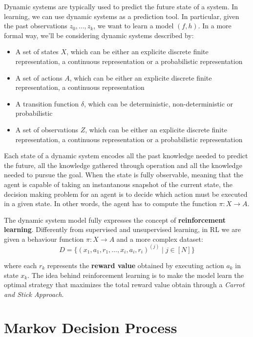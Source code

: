 \documentclass[a4paper, 12pt]{report}
\begin{document}
    Dynamic systems are typically used to predict the future state of a system. In learning, we can use dynamic systems as a prediction tool. In particular, given the past observations $z_0, \ldots, z_k$, we want to learn a model $(f,h)$. In a more formal way, we'll be considering dynamic systems described by:
    \begin{itemize}
        \item A set of states $X$, which can be either an explicite discrete finite representation, a continuous representation or a probabilistic representation
        \item A set of actions $A$, which can be either an explicite discrete finite representation, a continuous representation
        \item A transition function $\delta$, which can be deterministic, non-deterministic or probabilistic
        \item A set of observations $Z$, which can be either an explicite discrete finite representation, a continuous representation or a probabilistic representation
    \end{itemize}

    Each state of a dynamic system encodes all the past knowledge needed to predict the future, all the knowledge gathered through operation and all the knowledge needed to pursue the goal. When the state is fully observable, meaning that the agent is capable of taking an instantanous snapshot of the current state, the decision making problem for an agent is to decide which action must be executed in a given state. In other words, the agent has to compute the function $\pi : X \to A$.

    The dynamic system model fully expresses the concept of \textbf{reinforcement learning}. Differently from supervised and unsupervised learning, in RL we are given a behaviour function $\pi : X \to A$ and a more complex dataset:
    \[D = \{ (x_1,a_1,r_1, \ldots, x_i, a_i, r_i)^{(j)} \mid j \in [N]\}\]

    where each $r_k$ represents the \textbf{reward value} obtained by executing action $a_k$ in state $x_k$. The idea behind reinforcement learning is to make the model learn the optimal strategy that maximizes the total reward value obtain through a \textit{Carrot and Stick Approach}.

    \section{Markov Decision Process}
\end{document}

